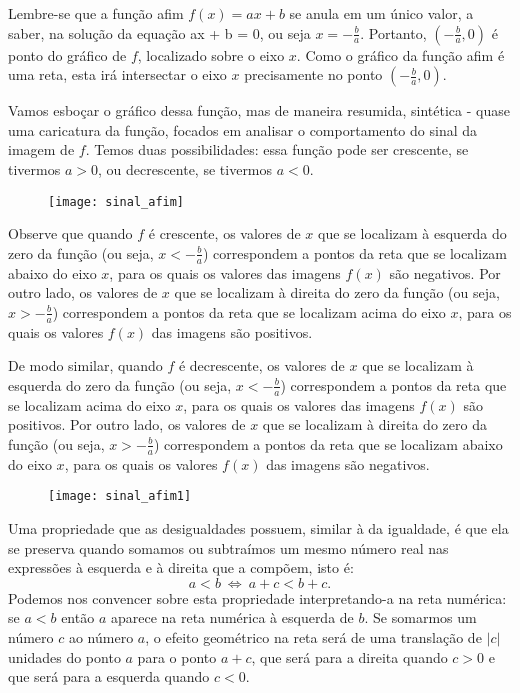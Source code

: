 Lembre-se que a função afim $f(x) = ax + b$ se anula em um único valor, a saber, na solução da equação ax + b = 0, ou seja $x =  -\frac{b}{a}$.  Portanto, $(-\frac{b}{a},0)$ é ponto do gráfico de $f$, localizado sobre o eixo $x$. Como o gráfico da função afim é uma reta, esta irá intersectar o eixo $x$ precisamente no ponto $(-\frac{b}{a},0)$.


Vamos esboçar o gráfico dessa função, mas de maneira resumida, sintética - quase uma caricatura da função, focados em analisar o comportamento do sinal da imagem de $f$. Temos duas possibilidades: essa função pode ser crescente, se tivermos $a > 0$, ou decrescente, se tivermos $a < 0$.

\begin{figure}[H]
\centering
\noindent\texttt{[image: sinal\_afim]}
\end{figure}

Observe que quando $f$ é crescente, os valores de $x$ que se localizam à esquerda do zero da função (ou seja, $x < -\frac{b}{a}$) correspondem a pontos da reta que se localizam abaixo do eixo $x$, para os quais os valores das imagens $f(x)$ são negativos. Por outro lado, os valores de $x$ que se localizam à direita do zero da função (ou seja, $x > -\frac{b}{a}$)  correspondem a pontos da reta que se localizam acima do eixo $x$, para os quais os valores $f(x)$ das imagens são positivos.

De modo similar, quando $f$ é decrescente, os valores de $x$ que se localizam à esquerda do zero da função (ou seja, $x < -\frac{b}{a}$) correspondem a pontos da reta que se localizam acima do eixo $x$, para os quais os valores das imagens $f(x)$ são positivos. Por outro lado, os valores de $x$ que se localizam à direita do zero da função (ou seja, $x > -\frac{b}{a}$)  correspondem a pontos da reta que se localizam abaixo do eixo $x$, para os quais os valores $f(x)$ das imagens são negativos.

\begin{figure}[H]
\centering
\noindent\texttt{[image: sinal\_afim1]}
\end{figure}

Uma propriedade que as desigualdades possuem, similar à da igualdade, é que ela se preserva quando somamos ou subtraímos um mesmo número real nas expressões à esquerda e à direita que a compõem, isto é:
$$
a < b \ \iff \ a + c < b +c. 
$$
Podemos nos convencer sobre esta propriedade interpretando-a na reta numérica: se $a < b$ então $a$ aparece na reta numérica à esquerda de $b$. Se somarmos um número $c$ ao número $a$, o efeito geométrico na reta será de uma translação de $|c|$ unidades do ponto $a$ para o ponto $a+c$, que será para a direita quando $c>0$ e que será para a esquerda quando $c <0$.

